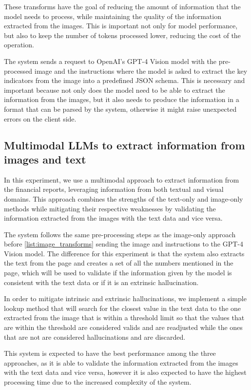 \documentclass[english, 12pt, a4paper, elec, utf8, a-2b, online]{aaltothesis}
\begin{document}
These transforms have the goal of reducing the amount of information that the model needs to process, while maintaining the quality of the information extracted from the images.
This is important not only for model performance, but also to keep the number of tokens processed lower, reducing the cost of the operation.

The system sends a request to OpenAI's \ac{GPT}-4 Vision model with the pre-processed image and the instructions where the model is asked to extract the key indicators from the image into a predefined JSON schema.
This is necessary and important because not only does the model need to be able to extract the information from the images, but it also needs to produce the information in a format that can be parsed by the system, otherwise it might raise unexpected errors on the client side.

\subsection{Multimodal \ac{LLM}s to extract information from images and text}

In this experiment, we use a multimodal approach to extract information from the financial reports, leveraging information from both textual and visual domains.
This approach combines the strengths of the text-only and image-only methods while mitigating their respective weaknesses by validating the information extracted from the images with the text data and vice versa.

The system follows the same pre-processing steps as the image-only approach before \ref{list:image_transforms} sending the image and instructions to the \ac{GPT}-4 Vision model.
The difference for this experiment is that the system also extracts the text from the page and creates a set of all the numbers mentioned in the page, which will be used to validate if the information given by the model is consistent with the text data or if it is an extrinsic hallucination.

In order to mitigate intrinsic and extrinsic hallucinations, we implement a simple lookup method that will search for the closest value in the text data to the one extracted from the image that is within a threshold limit so that the values that are within the threshold are considered valids and are readjusted while the ones that are not are considered hallucinations and are discarded.

This system is expected to have the best performance among the three approaches, as it is able to validate the information extracted from the images with the text data and vice versa, however it is also expected to have the highest processing time due to the increased complexity of the system.
\end{document}
